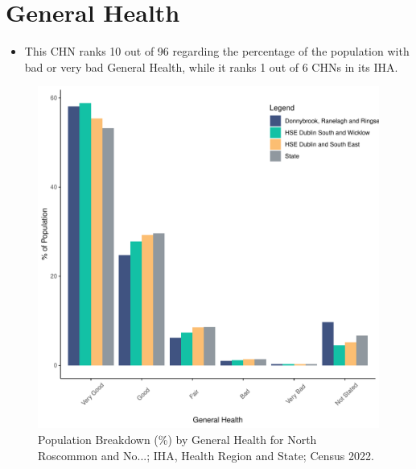 \documentclass{article}
\begin{document}
\pagebreak

\section{General Health}\label{sect:GenHealth}
\begin{itemize}
\item  This CHN ranks  10 out of 96 regarding the percentage of the population with bad or very bad General Health, while it ranks   1 out of 6 CHNs in its IHA.
\end{itemize}
\begin{figure}[h]
	\centering
	\includegraphics[width = 150mm]{../figures/GenED.pdf}
	\caption{Population Breakdown (\%) by General Health for North Roscommon and No...; IHA, Health Region and State;  Census 2022.}
	\label{fig:2ae19629-1a6a-13a3-e055-000000000001}
	\end{figure}
\end{document}

